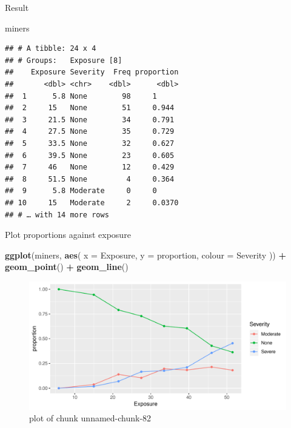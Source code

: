 \documentclass[ignorenonframetext,]{beamer}
\newenvironment{Shaded}{\begin{snugshade}}{\end{snugshade}}
\newcommand{\DataTypeTok}[1]{\textcolor[rgb]{0.13,0.29,0.53}{#1}}
\newcommand{\KeywordTok}[1]{\textcolor[rgb]{0.13,0.29,0.53}{\textbf{#1}}}
\newcommand{\NormalTok}[1]{#1}
\newcommand{\OperatorTok}[1]{\textcolor[rgb]{0.81,0.36,0.00}{\textbf{#1}}}
\newcommand{\StringTok}[1]{\textcolor[rgb]{0.31,0.60,0.02}{#1}}
\begin{document}
\begin{frame}[fragile]{Result}
\protect\hypertarget{result}{}

\begin{Shaded}
\begin{Highlighting}[]
\NormalTok{miners}
\end{Highlighting}
\end{Shaded}

\begin{verbatim}
## # A tibble: 24 x 4
## # Groups:   Exposure [8]
##    Exposure Severity  Freq proportion
##       <dbl> <chr>    <dbl>      <dbl>
##  1      5.8 None        98     1     
##  2     15   None        51     0.944 
##  3     21.5 None        34     0.791 
##  4     27.5 None        35     0.729 
##  5     33.5 None        32     0.627 
##  6     39.5 None        23     0.605 
##  7     46   None        12     0.429 
##  8     51.5 None         4     0.364 
##  9      5.8 Moderate     0     0     
## 10     15   Moderate     2     0.0370
## # … with 14 more rows
\end{verbatim}

\end{frame}

\begin{frame}[fragile]{Plot proportions against exposure}
\protect\hypertarget{plot-proportions-against-exposure}{}

\begin{Shaded}
\begin{Highlighting}[]
\KeywordTok{ggplot}\NormalTok{(miners, }\KeywordTok{aes}\NormalTok{(}
  \DataTypeTok{x =}\NormalTok{ Exposure, }\DataTypeTok{y =}\NormalTok{ proportion,}
  \DataTypeTok{colour =}\NormalTok{ Severity}
\NormalTok{)) }\OperatorTok{+}\StringTok{ }\KeywordTok{geom_point}\NormalTok{() }\OperatorTok{+}\StringTok{ }\KeywordTok{geom_line}\NormalTok{()}
\end{Highlighting}
\end{Shaded}

\begin{figure}
\centering
\includegraphics{figure/unnamed-chunk-82-1.pdf}
\caption{plot of chunk unnamed-chunk-82}
\end{figure}

\end{frame}
\end{document}
